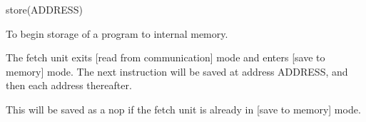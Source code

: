 

\format
store(ADDRESS)

\purpose

To begin storage of a program to internal memory.

\description

The fetch unit exits [read from communication] mode and enters [save to memory] mode.
The next instruction will be saved at address ADDRESS, and then each address thereafter.

\notes

This will be saved as a nop if the fetch unit is already in [save to memory] mode.
